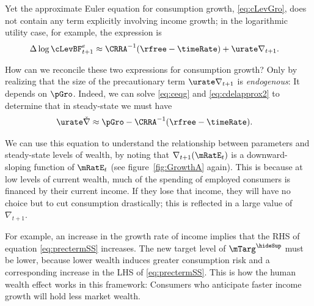 \documentclass{\handout}
\begin{document}
Yet the approximate Euler equation for consumption growth, \eqref{eq:cLevGro}, does 
not contain any term explicitly involving income growth; in the logarithmic utility
case, for example, the expression is
\begin{equation}\begin{gathered}\begin{aligned}
         \Delta \log \cLevBF^{e}_{t+1} & \approx  \CRRA^{-1}(\rfree-\timeRate) +  \urate \nabla _{t+1}. \label{eq:cdelapprox2}
\end{aligned}\end{gathered}\end{equation}

How can we reconcile these two expressions for consumption growth?
Only by realizing that the size of the precautionary term $\urate
\nabla_{t+1}$ is {\it endogenous}: It depends on $\pGro$.  Indeed, we
can solve \eqref{eq:ceqg} and \eqref{eq:cdelapprox2} to determine that
in steady-state we must have 
\begin{equation}\begin{gathered}\begin{aligned}
        \urate \check{\nabla} & \approx  \pGro - \CRRA^{-1}(\rfree-\timeRate). \label{eq:prectermSS}
\end{aligned}\end{gathered}\end{equation}

We can use this equation to understand the relationship between
parameters and steady-state levels of wealth, by noting that
$\nabla_{t+1}(\mRatE_{t})$ is a downward-sloping function of
$\mRatE_{t}$ (see figure~\ref{fig:GrowthA} again).  This is because at
low levels of current wealth, much of the spending of employed
consumers is financed by their current income.  If they lose that
income, they will have no choice but to cut consumption drastically; this is
reflected in a large value of $\nabla_{t+1}$.

For example, an increase in the growth rate of income implies that the
RHS of equation \eqref{eq:prectermSS} increases.  The new target level of
$\mTarg^{\hideSup}$ must be lower, because lower wealth induces greater consumption risk and a corresponding increase in the LHS of \eqref{eq:prectermSS}.  This is how the human wealth effect works in this framework:
Consumers who anticipate faster income growth will hold less market wealth.
\end{document}
